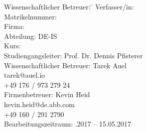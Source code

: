 \begin{titlepage}
\begin{center}
\begin{minipage}{\textwidth}
\begin{tabbing}
	Wissenschaftlicher Betreuer: \hspace{0.85cm}\=\kill
	Verfasser/in: \> \DerAutorDerArbeit \\[1.5mm]
	Matrikelnummer:  \\[1.5mm]
	Firma: \> \DerNameDerFirma  \\[1.5mm]
	Abteilung: \> DE-IS \\[1.5mm]
	Kurs: \> \DieKursbezeichnung \\[1.5mm]
	Studiengangsleiter: \> Prof. Dr. Dennis Pfisterer  \\[1.5mm]
	Wissenschaftlicher Betreuer: \> Tarek Auel \\
	\> tarek@auel.io \\
	\> +49 176 / 973 279 24 \\[1.5mm]
	Firmenbetreuer: \> Kevin Heid \\
	\> kevin.heid@de.abb.com \\
	\> +49 160 / 291 2790 \\[1.5mm]
	Bearbeitungszeitraum: .2017 -- 15.05.2017
\end{tabbing}
\end{minipage}

\end{center}

\end{titlepage}